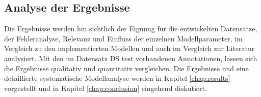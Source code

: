 \subsection*{Analyse der Ergebnisse}
 Die Ergebnisse werden hin sichtlich der Eignung für die entwickelten Datensätze, der Fehleranalyse, Relevanz und Einfluss der einzelnen Modellparameter, im Vergleich zu den implementierten Modellen und auch im Vergleich zur Literatur analysiert. Mit den im Datensatz DS \textunderscore test vorhandenen Annotationen, lassen sich die Ergebnisse qualitativ und quantitativ vergleichen. 
 Die Ergebnisse und eine detaillierte systematische Modellanalyse werden in Kapitel \ref{chap:results} vorgestellt und in Kapitel \ref{chap:conclusion} eingehend diskutiert.  







